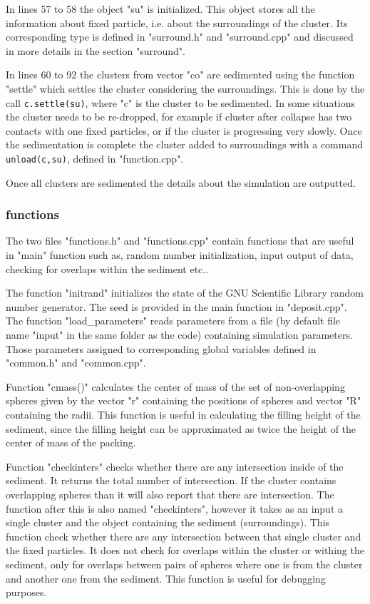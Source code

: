 \documentclass[12pt]{article}
\begin{document}
In lines 57 to 58 the object "su" is initialized. This object stores all the information about fixed particle, i.e. about the surroundings of the cluster. Its corresponding type is defined in "surround.h" and "surround.cpp" and discussed in more details in the section "surround". 

In lines 60 to 92 the clusters from vector "co" are sedimented using the function "settle" which settles the cluster considering the surroundings. This is done by the call \texttt{c.settle(su)}, where "c" is the cluster to be sedimented. In some situations the cluster needs to be re-dropped, for example if cluster after collapse has two contacts with one fixed particles, or if the cluster is progressing very slowly. Once the sedimentation is complete the cluster added to surroundings with a command \texttt{unload(c,su)}, defined in "function.cpp".  

Once all clusters are sedimented the details about the simulation are outputted.
\subsubsection{functions}
The two files "functions.h" and "functions.cpp" contain functions that are useful in "main" function such as, random number initialization, input output of data, checking for overlaps within the sediment etc..

The function "initrand" initializes the state of the GNU Scientific Library random number generator. The seed is provided in the main function in "deposit.cpp". The function "load\_parameters" reads parameters from a file (by default file name "input" in the same folder as the code) containing simulation parameters. Those parameters assigned to corresponding global variables defined in "common.h" and "common.cpp". 

Function "cmass()" calculates the center of mass of the set of non-overlapping spheres given by the vector "r" containing the positions of spheres and vector "R" containing the radii. This function is useful in calculating the filling height of the sediment, since the filling height can be approximated as twice the height of the center of mass of the packing. 

Function "checkinters" checks whether there are any intersection inside of the sediment. It returns the total number of intersection. If the cluster contains overlapping spheres than it will also report that there are intersection. The function after this is also named "checkinters", however it takes as an input a single cluster and the object containing the sediment (surroundings). This function check whether there are any intersection between that single cluster and the fixed particles. It does not check for overlaps within the cluster or withing the sediment, only for overlaps between pairs of spheres where one is from the cluster and another one from the sediment. This function is useful for debugging purposes. 
\end{document}
